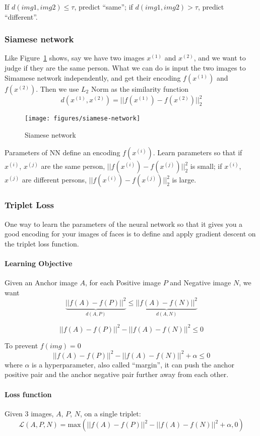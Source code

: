 \documentclass[UTF8]{article}
\newcommand{\Vector}[1]{\boldsymbol{\mathit{#1}}}   %
\newcommand{\Cal}[1]{\mathcal{#1}}                  %
\begin{document}
If $d(img1, img2) \leq \tau$, predict ``same''; if $d(img1, img2) > \tau$, predict ``different''.

\subsubsection{Siamese network}
Like Figure~\ref{fig:siamese-network} shows, say we have two images $x^{(1)}$ and $x^{(2)}$, and
we want to judge if they are the same person. What we can do is input the two images to Simamese
network independently, and get their encoding $f(x^{(1)})$ and $f(x^{(2)})$. Then we use $L_2$ Norm
as the similarity function
$$ d(x^{(1)}, x^{(2)}) = ||f(x^{(1)}) - f(x^{(2)})||_2^2 $$

\begin{figure}[htb]
    \centering
    \texttt{[image: figures/siamese-network]}
    \caption{Siamese network}
    \label{fig:siamese-network}
\end{figure}

Parameters of NN define an encoding $f(x^{(i)})$. Learn parameters so that if $x^{(i)}$, $x^{(j)}$
are the same person, $||f(x^{(i)}) - f(x^{(j)})||_2^2$ is small; if $x^{(i)}$, $x^{(j)}$ are
different persons, $||f(x^{(i)}) - f(x^{(j)})||_2^2$ is large.

\subsubsection{Triplet Loss}
One way to learn the parameters of the neural network so that it gives you a good encoding for your
images of faces is to define and apply gradient descent on the triplet loss function.

\paragraph{Learning Objective}
Given an Anchor image $A$, for each Positive image $P$ and Negative image $N$, we want
$$ \underbrace{||f(A)-f(P)||^2}_{d(A, P)} \leq \underbrace{||f(A)-f(N)||^2}_{d(A, N)} $$

$$ ||f(A)-f(P)||^2 - ||f(A)-f(N)||^2 \leq 0 $$

To prevent $f(img) = \Vector{0}$
$$ ||f(A)-f(P)||^2 - ||f(A)-f(N)||^2 + \alpha \leq 0 $$
where $\alpha$ is a hyperparameter, also called ``margin'', it can push the anchor positive pair
and the anchor negative pair further away from each other.

\paragraph{Loss function}
Given 3 images, $A$, $P$, $N$, on a single triplet:
$$ \Cal{L}(A, P, N) = \text{max}(||f(A)-f(P)||^2 - ||f(A)-f(N)||^2 + \alpha, 0) $$
\end{document}
